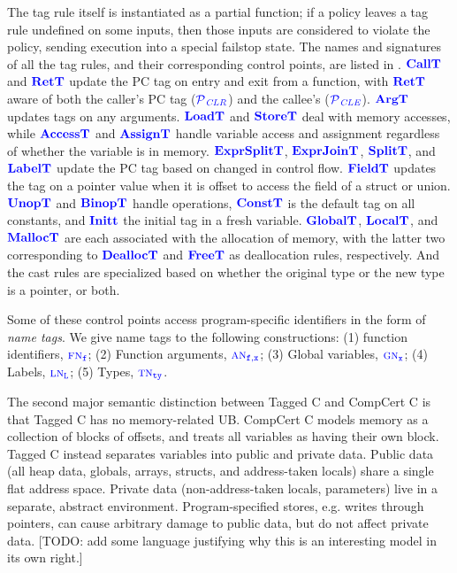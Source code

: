 \documentclass{llncs}
\begin{document}
The tag rule itself is instantiated as a partial function; if a policy leaves a tag rule
undefined on some inputs, then those inputs are considered to violate the policy, sending
execution into a special failstop state. The names and signatures of all the tag rules,
and their corresponding control points, are listed in .
\(\calltname\) and \(\rettname\) update the PC tag on entry and exit from a function,
with \(\rettname\) aware of both the caller's PC tag (\(\PCT[_{\color{blue} CLR}]\))
and the callee's (\(\PCT[_{\color{blue} CLE}]\)). \(\argtname\) updates tags on any arguments.
\(\loadtname\) and \(\storetname\) deal with memory accesses, while \(\accesstname\) and
\(\assigntname\) handle variable access and assignment regardless of whether the variable
is in memory. \(\exprsplittname\), \(\exprjointname\), \(\splittname\), and \(\labeltname\)
update the PC tag based on changed in control flow. \(\fieldtname\) updates the tag
on a pointer value when it is offset to access the field of a struct or union.
\(\unoptname\) and \(\binoptname\) handle operations, \(\constt\) is the default tag
on all constants, and \(\initt\) the initial tag in a fresh variable. \(\globaltname\), \(\localtname\),
and \(\malloctname\) are each associated with the allocation of memory, with the latter
two corresponding to \(\dealloctname\) and \(\freetname\) as deallocation rules,
respectively. And the cast rules are specialized based on whether the original type or
the new type is a pointer, or both.

Some of these control points access program-specific identifiers in the form of
{\em name tags}. We give name tags to the following constructions:
(1) function identifiers, \(\FN\); (2) Function arguments, \(\AN\); (3) Global variables, \(\GN\);
(4) Labels, \(\LN\); (5) Types, \(\TN\).

The second major semantic distinction between Tagged C and CompCert C is that Tagged C has no
memory-related UB. CompCert C models memory as a collection of blocks of offsets,
and treats all variables as having their own block. Tagged C instead separates variables
into public and private data. Public data (all heap data, globals, arrays, structs, and
address-taken locals) share a single flat address 
space.
Private data (non-address-taken locals, parameters) live in a separate, abstract environment.
Program-specified stores, e.g. writes through pointers, can cause arbitrary damage to public
data, but do not affect private data.
[TODO: add some language justifying why this is an interesting model in its own right.]
\end{document}
